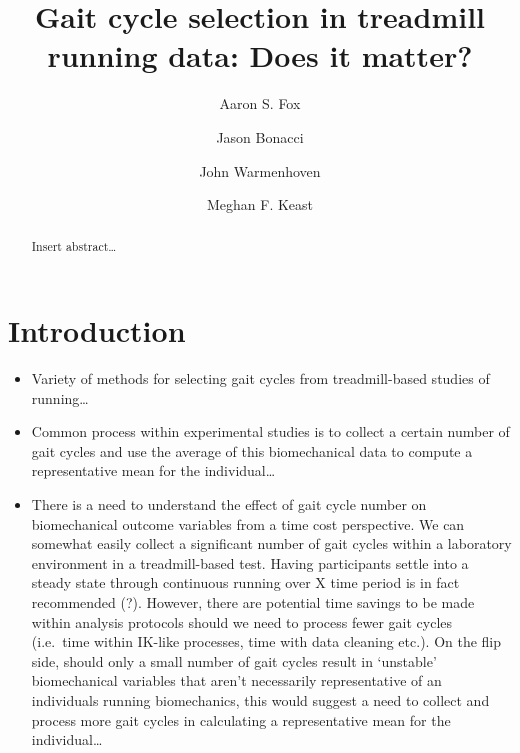 \documentclass[]{elsarticle} %
\begin{document}
\begin{frontmatter}

  \title{Gait cycle selection in treadmill running data: Does it
matter?}
    \author[Centre for Sport Research]{Aaron S. Fox}
  
    \author[Centre for Sport Research]{Jason Bonacci}
  
    \author[UNSW]{John Warmenhoven}
  
    \author[Centre for Sport Research]{Meghan F. Keast}
  
      \address[Centre for Sport Research]{Centre for Sport Research,
School of Exercise and Nutrition Sciences, Deakin University, Geelong,
Australia}
    \address[UNSW]{School of Engineering and Information Technology,
University of New South Wales, Canberra, Australia}
  
  \begin{abstract}
  Insert abstract\ldots{}
  \end{abstract}
  
 \end{frontmatter}

\hypertarget{introduction}{%
\section{Introduction}\label{introduction}}

\begin{itemize}
\item
  Variety of methods for selecting gait cycles from treadmill-based
  studies of running\ldots{}
\item
  Common process within experimental studies is to collect a certain
  number of gait cycles and use the average of this biomechanical data
  to compute a representative mean for the individual\ldots{}
\item
  There is a need to understand the effect of gait cycle number on
  biomechanical outcome variables from a time cost perspective. We can
  somewhat easily collect a significant number of gait cycles within a
  laboratory environment in a treadmill-based test. Having participants
  settle into a steady state through continuous running over X time
  period is in fact recommended (?). However, there are potential time
  savings to be made within analysis protocols should we need to process
  fewer gait cycles (i.e.~time within IK-like processes, time with data
  cleaning etc.). On the flip side, should only a small number of gait
  cycles result in `unstable' biomechanical variables that aren't
  necessarily representative of an individuals running biomechanics,
  this would suggest a need to collect and process more gait cycles in
  calculating a representative mean for the individual\ldots{}
\end{itemize}
\end{document}
